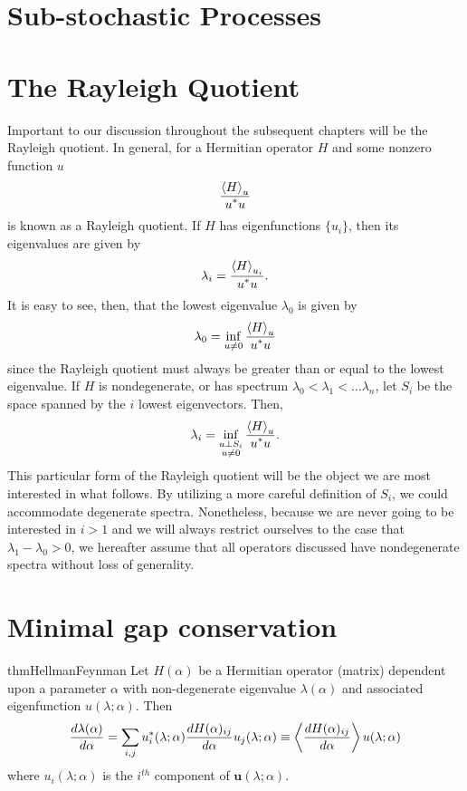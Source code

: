 \section{Sub-stochastic Processes}\label{sec:sub-stochastic}

\section{The Rayleigh Quotient}
  Important to our discussion throughout the subsequent chapters will be the Rayleigh quotient. In general, for a Hermitian operator $H$ and some nonzero function $u$
  \[
    \frac{\displaystyle \left \langle H \right \rangle_u}{\displaystyle u^* u}
  \]
  is known as a Rayleigh quotient. If $H$ has eigenfunctions $\{u_i\}$, then its eigenvalues are given by
  \[
      \lambda_i = \frac{\displaystyle \left \langle H \right \rangle_{u_i}}{\displaystyle u^* u}.
  \]
    It is easy to see, then, that the lowest eigenvalue $\lambda_0$ is given by
  \[
        \lambda_0 = \inf_{u \neq 0} \frac{\displaystyle \left \langle H \right \rangle_u}{\displaystyle u^* u}
  \]
  since the Rayleigh quotient must always be greater than or equal to the lowest eigenvalue. If $H$ is nondegenerate, or has spectrum $\lambda_0 < \lambda_1 < \dots \lambda_n$, let $S_i$ be the space spanned by the $i$ lowest eigenvectors. Then, 
  \begin{equation}\label{eqn:Rayleigh-eigenvalue}
        \lambda_i = \inf_{\substack{u \perp S_i \\ u \neq 0}} \frac{\displaystyle \left \langle H \right \rangle_u}{\displaystyle u^* u}.
  \end{equation}
  This particular form of the Rayleigh quotient will be the object we are most interested in what follows. By utilizing a more careful definition of $S_i$, we could accommodate degenerate spectra. Nonetheless, because we are never going to be interested in $i>1$ and we will always restrict ourselves to the case that $\lambda_1 -\lambda_0 > 0$, we hereafter assume that all operators discussed have nondegenerate spectra without loss of generality.  
  
\section{Minimal gap conservation}
    \begin{restatable}{thm}{HellmanFeynman}
      \label{thm:Hellman-Feynman}
      Let $H(\alpha)$ be a Hermitian operator (matrix) dependent upon a parameter $\alpha$ with non-degenerate eigenvalue $\lambda(\alpha)$ and associated eigenfunction $u(\lambda;\alpha)$. Then
    \[
      \frac{d \lambda(\alpha)}{d \alpha}  = \sum_{i,j} u_i^*(\lambda;\alpha) \frac{d H(\alpha)_{ij}}{d \alpha} u_j(\lambda;\alpha) \equiv \left \langle \frac{d H(\alpha)_{ij}}{d \alpha} \right \rangle{u(\lambda;\alpha)}
    \]
    where $u_i(\lambda;\alpha)$ is the $i^{th}$ component of $\mathbf{u}(\lambda;\alpha)$. 
    \end{restatable}
    
